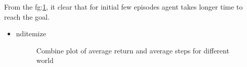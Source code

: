 \documentclass[preprint,12pt]{elsarticle}
\begin{document}
From the fg:\ref{fig:combiQ}, it clear that for initial few episodes agent takes longer time to reach the goal. 
\begin{itemize}
\item 
nd{itemize}

\begin{figure}[H]
	\centering  
	\caption{Combine plot of average return and average steps for different world}
	\label{fig:combiQ}
\end{figure}



\end{itemize}
\end{document}
